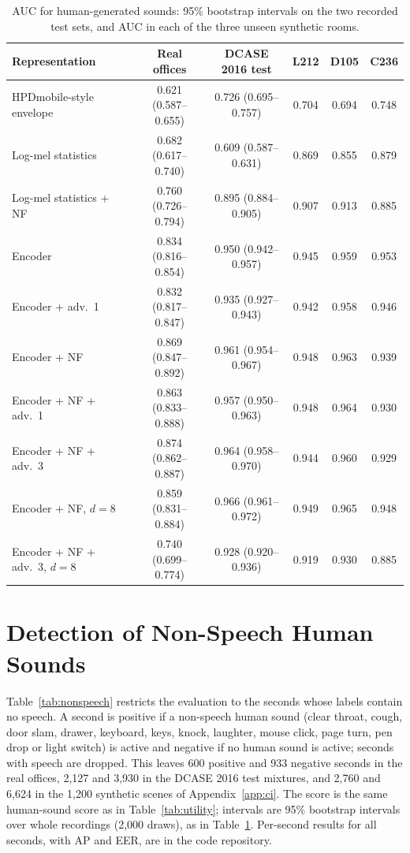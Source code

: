 \documentclass[11pt]{article}
\begin{document}
\begin{table}[h]
\centering\small
\caption{AUC for human-generated sounds: 95\% bootstrap intervals on the two recorded test sets, and AUC in each of the three unseen synthetic rooms.}
\label{tab:ci}
\begin{tabular}{@{}lccccc@{}}
\toprule
Representation & Real offices & DCASE 2016 test & L212 & D105 & C236 \\
\midrule
HPDmobile-style envelope & 0.621 (0.587--0.655) & 0.726 (0.695--0.757) & 0.704 & 0.694 & 0.748 \\
Log-mel statistics & 0.682 (0.617--0.740) & 0.609 (0.587--0.631) & 0.869 & 0.855 & 0.879 \\
Log-mel statistics + NF & 0.760 (0.726--0.794) & 0.895 (0.884--0.905) & 0.907 & 0.913 & 0.885 \\
Encoder & 0.834 (0.816--0.854) & 0.950 (0.942--0.957) & 0.945 & 0.959 & 0.953 \\
Encoder + adv.\ 1 & 0.832 (0.817--0.847) & 0.935 (0.927--0.943) & 0.942 & 0.958 & 0.946 \\
Encoder + NF & 0.869 (0.847--0.892) & 0.961 (0.954--0.967) & 0.948 & 0.963 & 0.939 \\
Encoder + NF + adv.\ 1 & 0.863 (0.833--0.888) & 0.957 (0.950--0.963) & 0.948 & 0.964 & 0.930 \\
Encoder + NF + adv.\ 3 & 0.874 (0.862--0.887) & 0.964 (0.958--0.970) & 0.944 & 0.960 & 0.929 \\
Encoder + NF, $d=8$ & 0.859 (0.831--0.884) & 0.966 (0.961--0.972) & 0.949 & 0.965 & 0.948 \\
Encoder + NF + adv.\ 3, $d=8$ & 0.740 (0.699--0.774) & 0.928 (0.920--0.936) & 0.919 & 0.930 & 0.885 \\
\bottomrule
\end{tabular}
\end{table}

\section{Detection of Non-Speech Human Sounds}
\label{app:nonspeech}
Table~\ref{tab:nonspeech} restricts the evaluation to the seconds whose labels contain no speech. A second is positive if a non-speech human sound (clear throat, cough, door slam, drawer, keyboard, keys, knock, laughter, mouse click, page turn, pen drop or light switch) is active and negative if no human sound is active; seconds with speech are dropped. This leaves 600 positive and 933 negative seconds in the real offices, 2,127 and 3,930 in the DCASE 2016 test mixtures, and 2,760 and 6,624 in the 1,200 synthetic scenes of Appendix~\ref{app:ci}. The score is the same human-sound score as in Table~\ref{tab:utility}; intervals are 95\% bootstrap intervals over whole recordings (2,000 draws), as in Table~\ref{tab:ci}. Per-second results for all seconds, with AP and EER, are in the code repository.
\end{document}
